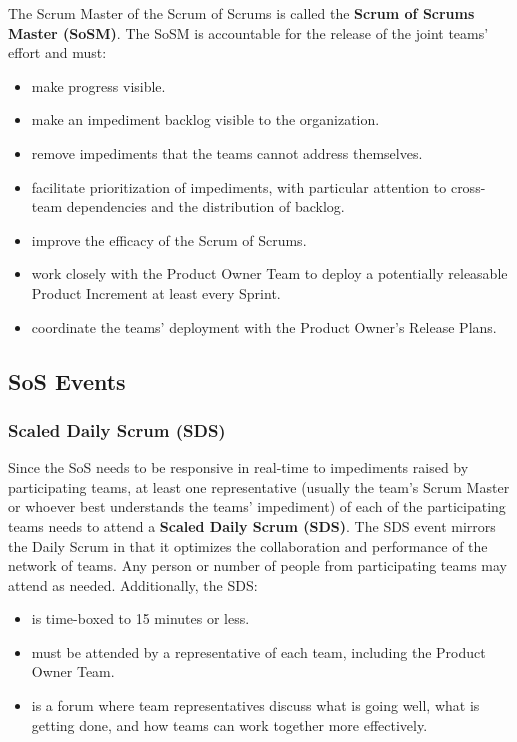 \documentclass[12pt,a4paper,parskip=full]{scrartcl}
\begin{document}
The Scrum Master of the Scrum of Scrums is called the \textbf{Scrum of Scrums Master (SoSM)}. The SoSM is accountable for the release of the joint teams' effort and must:

\begin{itemize}
	\item make progress visible.
	\item make an impediment backlog visible to the organization.
	\item remove impediments that the teams cannot address themselves.
	\item facilitate prioritization of impediments, with particular attention to cross-team dependencies and the distribution of backlog.
	\item improve the efficacy of the Scrum of Scrums.
	\item work closely with the Product Owner Team to deploy a potentially releasable Product Increment at least every Sprint.
	\item coordinate the teams' deployment with the Product Owner's Release Plans.
\end{itemize}

\subsection{SoS Events}

\subsubsection{Scaled Daily Scrum (SDS)}

Since the SoS needs to be responsive in real-time to impediments raised by participating teams, at least one representative (usually the team's Scrum Master or whoever best understands the teams' impediment) of each of the participating teams needs to attend a \textbf{Scaled Daily Scrum (SDS)}. The SDS event mirrors the Daily Scrum in that it optimizes the collaboration and performance of the network of teams. Any person or number of people from participating teams may attend as needed. Additionally, the SDS:

\begin{itemize}
	\item is time-boxed to 15 minutes or less.
	\item must be attended by a representative of each team, including the Product Owner Team.
	\item is a forum where team representatives discuss what is going well, what is getting done, and how teams can work together more effectively. 
\end{itemize}
	
\end{document}

